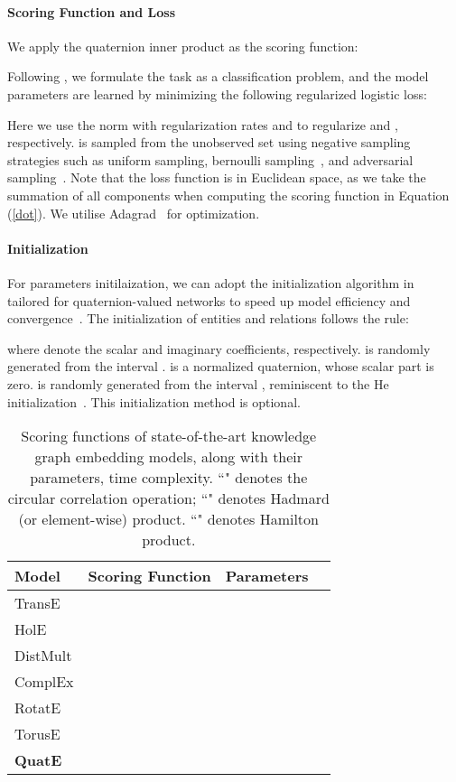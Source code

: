 \documentclass{article}
\begin{document}
\paragraph{Scoring Function and Loss}
We apply the quaternion inner product as the scoring function:

Following \citet{trouillon2016complex}, we formulate the task as a classification problem, and the model parameters are learned by minimizing the following regularized logistic loss:

Here we use the  norm with regularization rates  and  to regularize  and , respectively.  is sampled from the unobserved set  using negative sampling strategies such as uniform sampling, bernoulli sampling~\citep{wang2014knowledge}, and adversarial sampling~\citep{sun2019rotate}. Note that the loss function is in Euclidean space, as we take the summation of all components when computing the scoring function in Equation (\ref{dot}). We utilise Adagrad~\citep{duchi2011adaptive} for optimization.

\paragraph{Initialization} For parameters initilaization, we can adopt the initialization algorithm in~\citep{Parcollet2018QuaternionRN} tailored for quaternion-valued networks to speed up model efficiency and convergence~\citep{glorot2010understanding}. The initialization of entities and relations follows the rule:

where  denote the scalar and imaginary coefficients, respectively.  is randomly generated from the interval .  is a normalized quaternion, whose scalar part is zero.  is randomly generated from the interval , reminiscent to the He initialization~\citep{he2015delving}. This initialization method is optional.


\begin{table}[t]
\centering
\caption{Scoring functions of state-of-the-art knowledge graph embedding models, along with their parameters, time complexity. ``" denotes the circular correlation operation; ``" denotes Hadmard (or element-wise) product. ``" denotes Hamilton product.}
\small
\begin{tabular}{lccc}
\toprule
Model    & Scoring Function & Parameters &  \\ \midrule
TransE &               &            &   \\
HolE  &               &            &   \\
DistMult &                  &             &     \\
ComplEx  &                 &             &  \\
RotatE   &                  &             &  \\

TorusE &  &  &  \\ \midrule

\textbf{QuatE}    &                  &             & \\ \bottomrule
\end{tabular}
\vspace{-1em}
\label{scoring_function}
\end{table}
\end{document}
